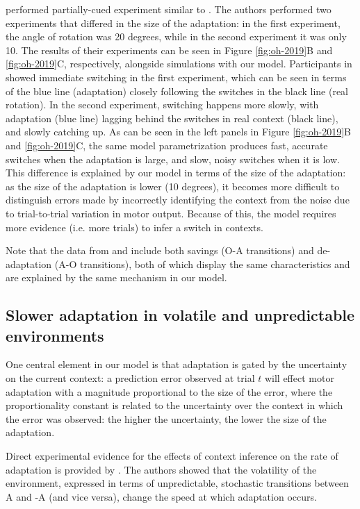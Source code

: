 \documentclass[a4paper,doc,floatsintext,natbib]{apa6}
\def \fref #1{Figure \ref{#1}}     %
\begin{document}
\cite{Oh_Minimizing_2019} performed partially-cued experiment similar to \cite{Kim_Neural_2015}. The authors performed two experiments that differed in the size of the adaptation: in the first experiment, the angle of rotation was 20 degrees, while in the second experiment it was only 10. The results of their experiments can be seen in \fref{fig:oh-2019}B and \ref{fig:oh-2019}C, respectively, alongside simulations with our model. Participants in \cite{Oh_Minimizing_2019} showed immediate switching in the first experiment, which can be seen in terms of the blue line (adaptation) closely following the switches in the black line (real rotation). In the second experiment, switching happens more slowly, with adaptation (blue line) lagging behind the switches in real context (black line), and slowly catching up. As can be seen in the left panels in \fref{fig:oh-2019}B and \ref{fig:oh-2019}C, the same model parametrization produces fast, accurate switches when the adaptation is large, and slow, noisy switches when it is low. This difference is explained by our model in terms of the size of the adaptation: as the size of the adaptation is lower (10 degrees), it becomes more difficult to distinguish errors made by incorrectly identifying the context from the noise due to trial-to-trial variation in motor output. Because of this, the model requires more evidence (i.e. more trials) to infer a switch in contexts.

Note that the data from \cite{Oh_Minimizing_2019} and \cite{Kim_Neural_2015} include both savings (O-A transitions) and de-adaptation (A-O transitions), both of which display the same characteristics and are explained by the same mechanism in our model.


\subsection{Slower adaptation in volatile and unpredictable environments}
One central element in our model is that adaptation is gated by the uncertainty on the current context: a prediction error observed at trial $t$ will effect motor adaptation with a magnitude proportional to the size of the error, where the proportionality constant is related to the uncertainty over the context in which the error was observed: the higher the uncertainty, the lower the size of the adaptation.

Direct experimental evidence for the effects of context inference on the rate of adaptation is provided by \cite{Herzfeld_memory_2014}. The authors showed that the volatility of the environment, expressed in terms of unpredictable, stochastic transitions between A and -A (and vice versa), change the speed at which adaptation occurs.
\end{document}
